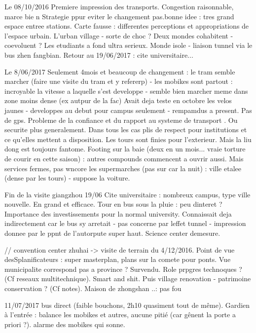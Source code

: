 Le 08/10/2016
Premiere impression des transports. Congestion raisonnable, marce bie
n
Strategie ppur eviter le changement pas.bonne idee : tres grand espace entree stations. Carte fausse : differentes perceptions et appropriations de l'espace urbain. L'urban village - sorte de choc ?
Deux mondes cohabitent - coevoluent ? Les etudiants a fond ultra serieux. Monde isole - liaison tunnel via le bus zhen fangbian.
Retour au 19/06/2017 : cite universitaire...


Le 8/06/2017
Seulement 4mois et beaucoup de changement : le tram semble marcher (faire une visite du tram et y refererp) - les mobikes sont partout : incroyable la vitesse a laquelle s'est developpe - semble bien marcher meme dans zone moins dense (ex autpur de la fac)
Avait deja teste en octobre les velos jaunes - developpes au debut pour campus seulement - rempamdus a present. Pas de gps. Probleme de la confiance et du rapport au systeme de transport . Ou securite plus generalement. Dans tous les cas plis de respect pour institutions et ce qu'elles mettent a disposition. Les tours sont finies pour l'exterieur. Mais la liu dong est toujours fantome.
Footing sur la baie (deux en un mois... vraie torture de courir en cette saison) : autres compounds commencent a ouvrir aussi. Mais services fermes, pas wncore les supermarches (pas sur car la nuit) : ville etalee (dense par les tours) - suppose la voiture.

Fin de la visite giangzhou 19/06
Cite universitaire : nombreux campus, type ville nouvelle. En grand et efficace. Tour en bus sous la pluie : peu dinteret ? Importance des investissements pour la normal university.
Connaissait deja indirectement car le bus sy arretait - pas concerne par leffet tunnel - impression donnee par le ppnt de l'autorpute super haut. Science center demesure.

// convention center zhuhai -> visite de terrain du 4/12/2016.
Point de vue desSplanificateurs : super masterplan, plans sur la comete pour ponts. Vue municipalite correspond pas a province ? Survendu. Role prpgres technoques ? (Cf reseaux multitechnique). Smart and shit. Puis village renovation - patrimoine conservation ? (Cf notes). Maison de zhongshan ..: pas fou


11/07/2017
bus direct (faible bouchons, 2h10 quasiment tout de même). Gardien à l'entrée : balance les mobikes et autres, aucune pitié (car gênent la porte a priori ?). alarme des mobikes qui sonne.





